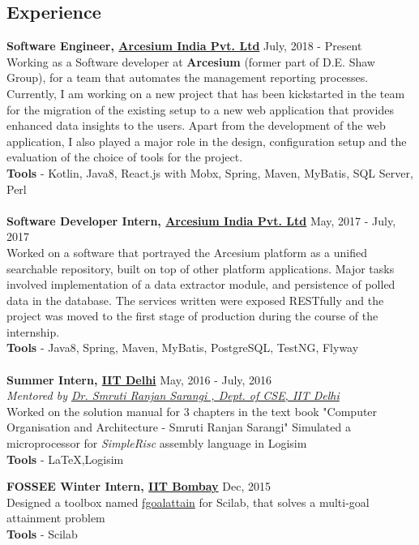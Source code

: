 \documentclass[margin, centered]{res}
\begin{document}
\begin{resume}
\section{Experience}
\textbf{Software Engineer, \href{http://www.arcesium.com/}{Arcesium India Pvt. Ltd}} \hfill July, 2018 - Present \\
Working as a Software developer at \textbf{Arcesium} (former part of D.E. Shaw Group), for a team that automates the management reporting processes. Currently, I am working on a new project that has been kickstarted in the team for the migration of the existing setup to a new web application that provides enhanced data insights to the users. Apart from the development of the web application, I also played a major role in the design, configuration setup and the evaluation of the choice of tools for the project. \\
\textbf{Tools} - Kotlin, Java8, React.js with Mobx, Spring, Maven, MyBatis, SQL Server,
Perl\\ \\
\textbf{Software Developer Intern, \href{http://www.arcesium.com/}{Arcesium India Pvt. Ltd}} \hfill May, 2017 - July, 2017\\
Worked on a software that portrayed the Arcesium platform as a
unified searchable repository, built on top of other platform applications. Major tasks involved implementation of a data extractor module, and persistence of polled data in the database. The services written were exposed RESTfully and the project was moved to the first stage of production during the course of the internship. \\
\textbf{Tools} - Java8, Spring, Maven, MyBatis, PostgreSQL, TestNG, Flyway\\
\\
\textbf{Summer Intern,  \href{http://www.iitd.ac.in/}{IIT Delhi}} \hfill May, 2016 - July, 2016 \\
\emph{Mentored by \href{http://www.cse.iitd.ac.in/~srsarangi/}{Dr. Smruti Ranjan Sarangi , Dept. of CSE, IIT Delhi}} \\
Worked on the solution manual for 3 chapters in the text book "Computer Organisation and Architecture - Smruti Ranjan Sarangi" 
Simulated a microprocessor for \textit{SimpleRisc} assembly language in Logisim\\
\textbf{Tools} - \LaTeX{},Logisim 

\textbf{FOSSEE Winter Intern, \href{http://www.iitb.ac.in/}{IIT Bombay}} \hfill Dec, 2015\\
Designed a toolbox named \href{http://www.scilab.in/scilab-toolbox-help-files/fgoalattain.php}{fgoalattain} for Scilab, that solves a multi-goal attainment problem\\
\textbf{Tools} - Scilab


\end{resume}
\end{document}
